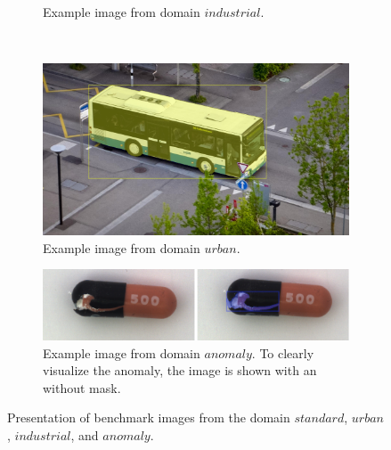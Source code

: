 \begin{figure}
\begin{subfigure}[b]{0.45\textwidth}
		\caption{
			Example image from domain $ industrial $.
		} \label{fig:ch4:sec4:domain_industrial}
	\end{subfigure}
	\\
	\begin{subfigure}[b]{0.45\textwidth}
		\centering
		\includegraphics[width=\textwidth]{figures/chap44_urban.png}
		\caption{
			Example image from domain $ urban $.
		} \label{fig:ch4:sec4:domain_urban}
	\end{subfigure}
	\hfill
	\begin{subfigure}[b]{0.45\textwidth}
		\centering
		\includegraphics[width=\textwidth]{figures/chap44_anomaly.png}
		\caption{
			Example image from domain $ anomaly $.
			To clearly visualize the anomaly, the image is shown with an without mask.
		} \label{fig:ch4:sec4:domain_anomaly}
	\end{subfigure}
	\caption[Illustration of benchmark images]{
		Presentation of benchmark images from the domain $ standard $, $ urban $, $ industrial $, and $ anomaly $.
	} \label{fig:ch4:sec4:image_domains}
\end{figure}


